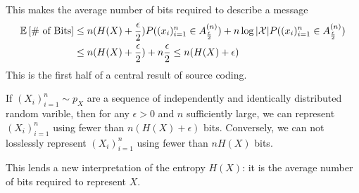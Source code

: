 This makes the average number of bits required to describe a message 
\begin{align*}
	\mathbb{E}\left[\text{\# of Bits}\right] &\leq n(H(X)+\frac{\epsilon}{2})P((x_i)_{i=1}^n\in A_{\frac{\epsilon}{2}}^{(n)}) + n\log |\mathcal{X}|P((x_i)_{i=1}^n\in A_{\frac{\epsilon}{2}}^{(n)}) \\
	&\leq n(H(X)+\frac{\epsilon}{2}) + n \frac{\epsilon}{2} \leq n(H(X)+\epsilon)
\end{align*}
This is the first half of a central result of source coding.
\begin{theorem}
	If $(X_i)_{i=1}^n \sim p_X$ are a sequence of independently and identically distributed random varible, then for any $\epsilon > 0$ and $n$ sufficiently large, we can represent $(X_i)_{i=1}^n$ using fewer than $n(H(X) + \epsilon)$ bits. Conversely, we can not losslessly represent $(X_i)_{i=1}^n$ using fewer than $nH(X)$ bits.
	\label{thm:source-coding}
\end{theorem}
This lends a new interpretation of the entropy $H(X)$: it is the average number of bits required to represent $X$.
